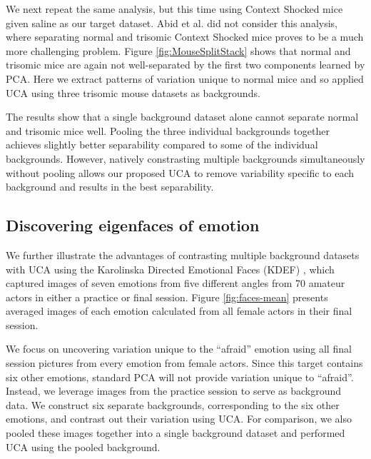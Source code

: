 \documentclass[12pt]{article}
\begin{document}
We next repeat the same analysis, but this time using Context Shocked mice given saline as our target dataset. Abid et al. \cite{Abid} did not consider this analysis, where separating normal and trisomic Context Shocked mice proves to be a much more challenging problem. Figure \ref{fig:MouseSplitStack} shows that normal and trisomic mice are again not well-separated by the first two components learned by PCA.
Here we extract patterns of variation unique to normal mice and so applied UCA using three trisomic mouse datasets as backgrounds.

The results show that a single background dataset alone cannot separate normal and trisomic mice well. Pooling the three individual backgrounds together achieves slightly better separability compared to some of the individual backgrounds. However, natively constrasting multiple backgrounds simultaneously without pooling allows our proposed UCA to remove variability specific to each background and results in the best separability.






\subsection{\label{sec:faces}Discovering eigenfaces of emotion}

We further illustrate the advantages of contrasting multiple background datasets with UCA using the Karolinska Directed Emotional Faces (KDEF) \cite{Calvo2008}, which captured images of seven emotions from five different angles from 70 amateur actors in either a practice or final session. Figure \ref{fig:faces-mean} presents averaged images of each emotion calculated from all female actors in their final session. 

We focus on uncovering variation unique to the ``afraid'' emotion using all final session pictures from every emotion from female actors. Since this target contains six other emotions, standard PCA will not provide variation unique to ``afraid''. Instead, we leverage images from the practice session to serve as background data. We construct six separate backgrounds, corresponding to the six other emotions, and contrast out their variation using UCA. For comparison, we also pooled these images together into a single background dataset and performed UCA using the pooled background.
\end{document}
